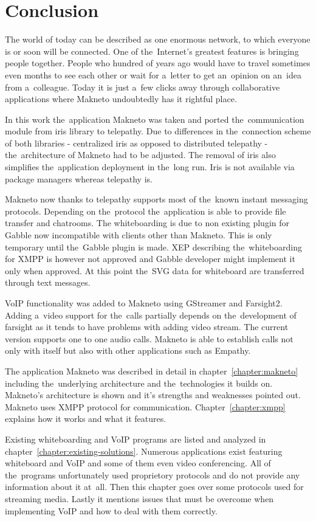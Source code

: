 \chapter*{Conclusion}
The world of today can be described as one enormous network, to which everyone is or soon will be connected. One of the~Internet's greatest features is bringing people together. People who hundred of years ago would have to travel sometimes even months to see each other or wait for a~letter to get an~opinion on an~idea from a~colleague. Today it is just a~few clicks away through collaborative applications where Makneto undoubtedly has it rightful place.

In this work the~application Makneto was taken and ported the~communication module from iris library to telepathy. Due to differences in the~connection scheme of both libraries - centralized iris as opposed to distributed telepathy - the~architecture of Makneto had to be adjusted. The removal of iris also simplifies the~application deployment in the~long run. Iris is not available via package managers whereas telepathy is. 

Makneto now thanks to telepathy supports most of the~known instant messaging protocols. Depending on the~protocol the~application is able to provide file transfer and chatrooms. The whiteboarding is due to non existing plugin for Gabble now incompatible with clients other than Makneto. This is only temporary until the~Gabble plugin is made. XEP describing the~whiteboarding for XMPP is however not approved and Gabble developer might implement it only when approved. At this point the~SVG data for whiteboard are transferred through text messages. 

VoIP functionality was added to Makneto using GStreamer and Farsight2. Adding a~video support for the~calls partially depends on the~development of farsight as it tends to have problems with adding video stream. The current version supports one to one audio calls. Makneto is able to establish calls not only with itself but also with other applications such as Empathy. 

The application Makneto was described in detail in chapter~\ref{chapter:makneto} including the~underlying architecture and the~technologies it builds on. Makneto's architecture is shown and it's strengths and weaknesses pointed out. Makneto uses XMPP protocol for communication. Chapter~\ref{chapter:xmpp} explains how it works and what it features.

Existing whiteboarding and VoIP programs are listed and analyzed in chapter~\ref{chapter:existing-solutions}. Numerous applications exist featuring whiteboard and VoIP and some of them even video conferencing. All of the~programs unfortunately used proprietory protocols and do not provide any information about it at~all. Then this chapter goes over some protocols used for streaming media. Lastly it mentions issues that must be overcome when implementing VoIP and how to deal with them correctly. 


